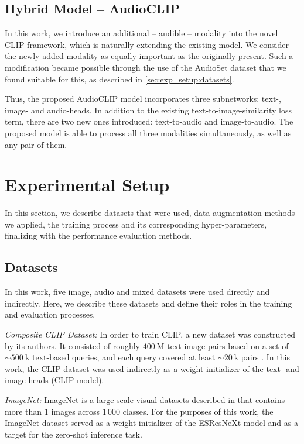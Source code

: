 \documentclass[runningheads]{llncs}
\begin{document}
\subsection{Hybrid Model -- AudioCLIP} \label{sec:model:audioclip}

In this work, we introduce an additional -- audible -- modality into the novel \mbox{CLIP} framework, which is naturally extending the existing model.
We consider the newly added modality as equally important as the originally present.
Such a modification became possible through the use of the \mbox{AudioSet} \cite{gemmeke2017audioset} dataset that we found suitable for this, as described in \autoref{sec:exp_setup:datasets}.

Thus, the proposed \mbox{AudioCLIP} model incorporates three subnetworks: text-, image- and audio-heads.
In addition to the existing text-to-image-similarity loss term, there are two new ones introduced: text-to-audio and image-to-audio.
The proposed model is able to process all three modalities simultaneously, as well as any pair of them.

\section{Experimental Setup} \label{sec:exp_setup}
In this section, we describe datasets that were used, data augmentation methods we applied, the training process and its corresponding hyper-parameters, finalizing with the performance evaluation methods.

\subsection{Datasets} \label{sec:exp_setup:datasets}
In this work, five image, audio and mixed datasets were used directly and indirectly.
Here, we describe these datasets and define their roles in the training and evaluation processes.

\emph{Composite CLIP Dataset:} In order to train \mbox{CLIP}, a new dataset was constructed by its authors.
It consisted of roughly $400\:\si{\mega}$ text-image pairs based on a set of $\sim 500\:\si{\kilo}$ text-based queries, and each query covered at least $\sim 20\:\si{\kilo}$ pairs \cite{radford2021clip}.
In this work, the \mbox{CLIP} dataset was used indirectly as a weight initializer of the text- and image-heads (\mbox{CLIP} model).

\emph{ImageNet:} \mbox{ImageNet} is a large-scale visual datasets described in \cite{deng2009imagenet} that contains more than \mbox{$1$\:\si{\mega}} images across $1\,000$ classes.
For the purposes of this work, the \mbox{ImageNet} dataset served as a weight initializer of the \mbox{ESResNeXt} model and as a target for the zero-shot inference task.
\end{document}
